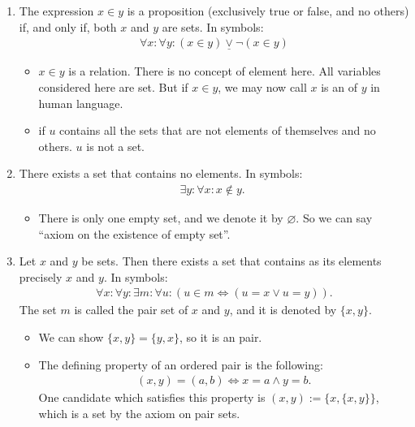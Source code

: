 \documentclass{article}
\begin{document}
\begin{enumerate}
    \item {} The expression $x \in y$ is a proposition (exclusively true or false, and no others) if, and only if, both $x$ and $y$ are sets. In symbols:
\begin{align*}
\forall x: \forall y:(x \in y) \underline{\vee} \neg(x \in y)
\end{align*}
    \begin{itemize}
        \item $x \in y$ is a relation. There is no concept of element here. All variables considered here are set. But if $x \in y$, we may now call $x$ is an  of $y$ in human language.
        \item {} if $u$ contains all the sets that are not elements of themselves and no others. $u$ is not a set. 
    \end{itemize}
    \item {} There exists a set that contains no elements. In symbols:
\begin{align*}
\exists y: \forall x: x \notin y \text {. }
\end{align*}
\begin{itemize}
    \item  There is only one empty set, and we denote it by $\varnothing$. So we can say ``axiom on the existence of  empty set''.
\end{itemize}
\item {} Let $x$ and $y$ be sets. Then there exists a set that contains as its elements precisely $x$ and $y$. In symbols:
\begin{align*}
\forall x: \forall y: \exists m: \forall u:(u \in m \Leftrightarrow(u=x \vee u=y)) .
\end{align*}
The set $m$ is called the pair set of $x$ and $y$, and it is denoted by $\{x, y\}$.
\begin{itemize}
    \item We can show $\{x, y\} = \{y, x\}$, so it is an  pair.
\item The defining property of an ordered pair is the following:
\begin{align*}
(x, y)=(a, b) \Leftrightarrow x=a \wedge y=b .
\end{align*}
One candidate which satisfies this property is $(x, y):=\{x,\{x, y\}\}$, which is a set by the axiom on pair sets.

\end{itemize}
\end{enumerate}
\end{document}
